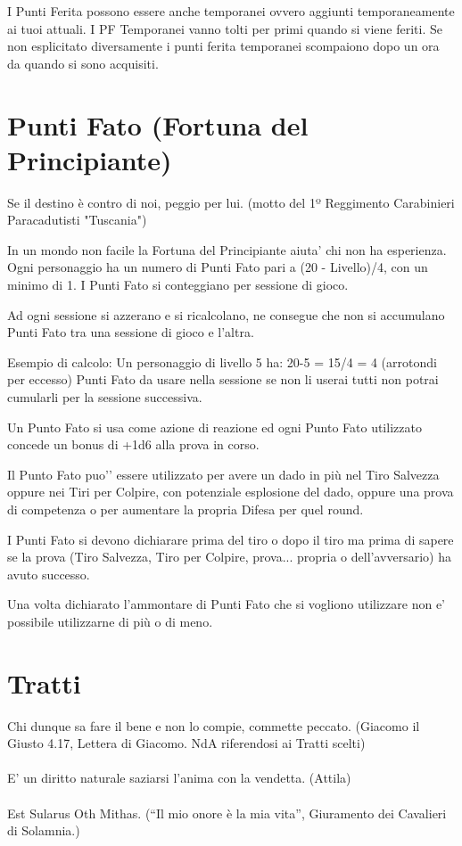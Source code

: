 \documentclass[a4paper,11pt,twoside,openany]{book}
\begin{document}
I Punti Ferita possono essere anche temporanei ovvero aggiunti temporaneamente ai tuoi attuali. I PF Temporanei vanno tolti per primi quando si viene feriti.
Se non esplicitato diversamente i punti ferita temporanei scompaiono dopo un ora da quando si sono acquisiti.

\section{Punti Fato (Fortuna del Principiante)}
\begin{tcolorbox}[enhanced,arc=5pt,boxrule=0.3pt]{Se il destino è contro di noi, peggio per lui. (motto del 1º Reggimento Carabinieri Paracadutisti "Tuscania")}\end{tcolorbox}\medskip

In un mondo non facile la Fortuna del Principiante aiuta’ chi non ha esperienza.
Ogni personaggio ha un numero di Punti Fato pari a (20 - Livello)/4, con un minimo di 1. I Punti Fato si conteggiano per sessione di gioco.

Ad ogni sessione si azzerano e si ricalcolano, ne consegue che non si accumulano Punti Fato tra una sessione di gioco e l’altra.

Esempio di calcolo:
Un personaggio di livello 5 ha: 20-5 = 15/4 = 4 (arrotondi per eccesso) Punti Fato da usare nella sessione se non li userai tutti non potrai cumularli per la sessione successiva.

Un Punto Fato si usa come azione di reazione ed ogni Punto Fato utilizzato concede un bonus di +1d6 alla prova in corso.

Il Punto Fato puo'’ essere utilizzato per avere un dado in più nel Tiro Salvezza oppure nei Tiri per Colpire, con potenziale esplosione del dado, oppure una prova di competenza o per aumentare la propria Difesa per quel round.

I Punti Fato si devono dichiarare prima del tiro o dopo il tiro ma prima di sapere se la prova (Tiro Salvezza, Tiro per Colpire, prova... propria o dell’avversario) ha avuto successo.

Una volta dichiarato l’ammontare di Punti Fato che si vogliono utilizzare non e’ possibile utilizzarne di più o di meno.

\section{Tratti}

\label{tratti}
\begin{tcolorbox}[enhanced,arc=5pt,boxrule=0.3pt]{Chi dunque sa fare il bene e non lo compie, commette peccato. (Giacomo il Giusto 4.17, Lettera di Giacomo. NdA riferendosi ai Tratti scelti)\\\\
E' un diritto naturale saziarsi l'anima con la vendetta. (Attila)\\\\
Est Sularus Oth Mithas. (“Il mio onore è la mia vita”, Giuramento dei Cavalieri di Solamnia.)}\end{tcolorbox}\medskip
\end{document}
